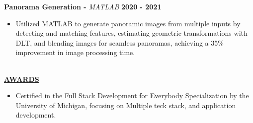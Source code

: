 \documentclass{article}
\begin{document}
\noindent \textbf{Panorama Generation -} \textit{MATLAB} \hfill \textbf{2020 - 2021}
\begin{itemize}[noitemsep,nolistsep,leftmargin=*]
\item {\small Utilized MATLAB to generate panoramic images from multiple inputs by detecting and matching features, estimating geometric transformations with DLT, and blending images for seamless panoramas, achieving a 35\% improvement in image processing time.}
\end{itemize}

\noindent \textbf{\underline{}} \\
\noindent \textbf{\underline{AWARDS}} 
\begin{itemize}[noitemsep,nolistsep,leftmargin=*]
\item {\small  Certified in the Full Stack Development for Everybody Specialization by the University of Michigan, focusing on Multiple teck stack, and application development. }
\end{itemize}

\end{document}
